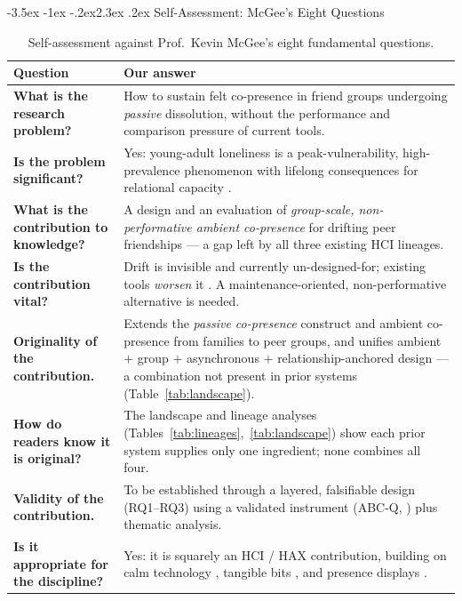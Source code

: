 \documentclass[11pt]{article}
\makeatletter
\renewcommand\section{\@startsection{section}{1}{\z@}%
  {-3.5ex \@plus -1ex \@minus -.2ex}{2.3ex \@plus .2ex}%
  {\normalfont\Large\bfseries\color{accent}}}
\makeatother
\begin{document}
\section{Self-Assessment: McGee's Eight Questions}

\begin{table}[t]
\centering
\caption{Self-assessment against Prof.\ Kevin McGee's eight fundamental questions.}
\label{tab:mcgee}
\small
\begin{tabularx}{\textwidth}{>{\bfseries}p{4.6cm} Y}
\toprule
Question & Our answer \\
\midrule
What is the research problem? & How to sustain felt co-presence in friend groups undergoing \emph{passive} dissolution, without the performance and comparison pressure of current tools. \\
Is the problem significant? & Yes: young-adult loneliness is a peak-vulnerability, high-prevalence phenomenon \citep{barreto2021, cigna2020} with lifelong consequences for relational capacity \citep{allen2024, rawlins2017}. \\
What is the contribution to knowledge? & A design and an evaluation of \emph{group-scale, non-performative ambient co-presence} for drifting peer friendships --- a gap left by all three existing HCI lineages. \\
Is the contribution vital? & Drift is invisible and currently un-designed-for; existing tools \emph{worsen} it \citep{robertsyoungdavid2025}. A maintenance-oriented, non-performative alternative is needed. \\
Originality of the contribution. & Extends the \emph{passive co-presence} construct \citep{shakeri2024} and ambient co-presence \citep{madianou2016} from families to peer groups, and unifies ambient $+$ group $+$ asynchronous $+$ relationship-anchored design --- a combination not present in prior systems (Table~\ref{tab:landscape}). \\
How do readers know it is original? & The landscape and lineage analyses (Tables~\ref{tab:lineages},~\ref{tab:landscape}) show each prior system supplies only one ingredient; none combines all four. \\
Validity of the contribution. & To be established through a layered, falsifiable design (RQ1--RQ3) using a validated instrument (ABC-Q, \citealp{ijsselsteijn2009}) plus thematic analysis. \\
Is it appropriate for the discipline? & Yes: it is squarely an HCI / HAX contribution, building on calm technology \citep{weiserbrown1996}, tangible bits \citep{ishiiullmer1997}, and presence displays \citep{deyguzman2006}. \\
\bottomrule
\end{tabularx}
\end{table}
\end{document}

